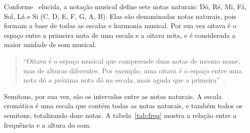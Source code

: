 \documentclass{sbrt}
\begin{document}
Conforme~\cite{moretti2003prototipo} elucida, a notação musical define sete notas naturais: Dó, Ré, Mi, Fá, Sol, Lá e Si
(C, D, E, F, G, A, B). Elas são denominadas notas naturais, pois formam a base de todas as escalas e harmonia musical.
Por sua vez oitava é o espaço entre a primeira nota de uma escala e a oitava nota, e é considerada a maior unidade de
som musical.

\begin{quote}
  ``Oitava é o espaço musical que compreende duas notas de mesmo nome, mas de alturas diferentes. Por exemplo, uma
  oitava é o espaço entre uma nota dó a próxima nota dó na escala, mais aguda que a
  primeira''~\cite{moretti2003prototipo}.
\end{quote}

Semitons, por sua vez, são os intervalos entre as notas naturais. A escala cromática é uma escala que contém todas as
notas naturais, e também todos os semitons, totalizando doze notas. A tabela~\ref{tab:freq} mostra a relação entre a
frequência e a altura do som.
\end{document}

